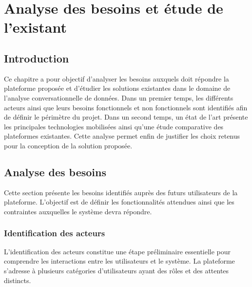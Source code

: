 \chapter{Analyse des besoins et étude de l'existant}

\section{Introduction}

Ce chapitre a pour objectif d'analyser les besoins auxquels doit répondre la plateforme proposée et d'étudier les solutions existantes dans le domaine de l'analyse conversationnelle de données. Dans un premier temps, les différents acteurs ainsi que leurs besoins fonctionnels et non fonctionnels sont identifiés afin de définir le périmètre du projet. Dans un second temps, un état de l'art présente les principales technologies mobilisées ainsi qu'une étude comparative des plateformes existantes. Cette analyse permet enfin de justifier les choix retenus pour la conception de la solution proposée.

\section{Analyse des besoins}

Cette section présente les besoins identifiés auprès des futurs utilisateurs de la plateforme. L'objectif est de définir les fonctionnalités attendues ainsi que les contraintes auxquelles le système devra répondre.

\subsection{Identification des acteurs}

L'identification des acteurs constitue une étape préliminaire essentielle pour comprendre les interactions entre les utilisateurs et le système. La plateforme s'adresse à plusieurs catégories d'utilisateurs ayant des rôles et des attentes distincts.


